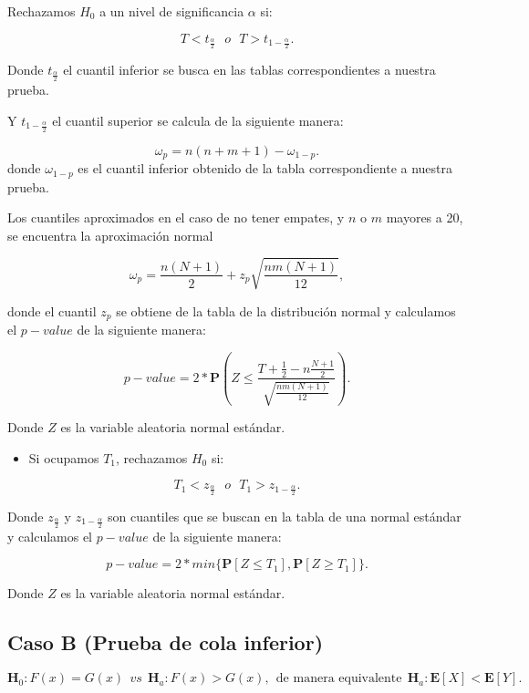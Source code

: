 \documentclass[
  a4paper,
  oneside,
  openany]{book}
\providecommand{\tightlist}{%
  \setlength{\itemsep}{0pt}\setlength{\parskip}{0pt}}
\begin{document}
Rechazamos \(H_0\) a un nivel de significancia \(\alpha\) si:

\[T < t_{\frac{\alpha}{2}} \ \ \   o \ \ \ T > t_{1-\frac{\alpha}{2}}.\]

Donde \(t_\frac{\alpha}{2}\) el cuantil inferior se busca en las tablas correspondientes a nuestra prueba.

Y \(t_{1-\frac{\alpha}{2}}\) el cuantil superior se calcula de la siguiente manera:

\[\omega_p= n(n+m+1)-\omega_{1-p}.\]
donde \(\omega_{1-p}\) es el cuantil inferior obtenido de la tabla correspondiente a nuestra prueba.

Los cuantiles aproximados en el caso de no tener empates, y \(n\) o \(m\) mayores a 20, se encuentra la aproximación normal

\[\omega_p= \frac{n(N+1)}{2} + z_p\sqrt{\frac{n m(N+1)}{12}},\]

donde el cuantil \(z_p\) se obtiene de la tabla de la distribución normal y calculamos el \(p-value\) de la siguiente manera:

\[p-value = 2*\mathbf{P}\left(Z\leq\frac{T+\frac{1}{2}-n\frac{N+1}{2}}{\sqrt{\frac{nm(N+1)}{12}}}\right).\]

Donde \(Z\) es la variable aleatoria normal estándar.

\begin{itemize}
\tightlist
\item
  Si ocupamos \(T_{1}\), rechazamos \(H_0\) si:
\end{itemize}

\[T_{1} < z_{\frac{\alpha}{2}} \ \ \  o \ \ \  T_{1} > z_{1-\frac{\alpha}{2}}.\]

Donde \(z_\frac{\alpha}{2}\) y \(z_{1-\frac{\alpha}{2}}\) son cuantiles que se buscan en la tabla de una normal estándar y calculamos el \(p-value\) de la siguiente manera:

\[p-value=2*min\{\mathbf{P}[Z\leq T_{1}],\mathbf{P}[Z\geq T_{1}]\}.\]

Donde \(Z\) es la variable aleatoria normal estándar.

\hypertarget{caso-b-prueba-de-cola-inferior-4}{%
\subsection*{Caso B (Prueba de cola inferior)}\label{caso-b-prueba-de-cola-inferior-4}}


\[\textbf{H}_0: F(x) = G(x) \ \ vs \ \ \textbf{H}_a: F(x) > G(x),  \ \ \mbox{de manera equivalente} \ \ \textbf{H}_a:\mathbf{E}[X]  < \mathbf{E}[Y].\]
\end{document}
